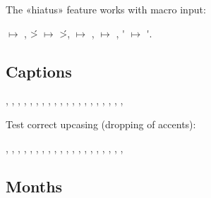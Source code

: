 \documentclass[a4paper]{article}
\begin{document}
The «hiatus» feature works with macro input:

\acctonos\textalpha\textupsilon\textlambda\textomicron\textfinalsigma{}
$\mapsto$
\MakeUppercase{\acctonos\textalpha\textupsilon\textlambda\textomicron\textfinalsigma},
\'>\textalpha\textupsilon\textlambda\textomicron\textfinalsigma{} $\mapsto$
\MakeUppercase{\'>\textalpha\textupsilon\textlambda\textomicron\textfinalsigma},
\textmu\acctonos\textalpha\textiota\textnu\textalpha{} $\mapsto$
\MakeUppercase{\textmu\acctonos\textalpha\textiota\textnu\textalpha},
\textkappa\acctonos\textepsilon\textiota\textkappa $\mapsto$
\MakeUppercase{\textkappa\acctonos\textepsilon\textiota\textkappa},
\accpsili\textalpha\textupsilon\textpi\textnu\'\textiota\textalpha{} $\mapsto$
\MakeUppercase{\accpsili\textalpha\textupsilon\textpi\textnu\'\textiota\textalpha}.

\subsection{Captions}

\prefacename,
\refname,
\abstractname,
\bibname,
\chaptername,
\appendixname,
\contentsname,
\listfigurename ,
\listtablename,
\indexname,
\figurename,
\tablename,
\partname,
\enclname,
\ccname,
\headtoname,
\pagename,
\seename,
\alsoname,
\proofname,
\glossaryname
{}

Test correct upcasing (dropping of accents):

\MakeUppercase{
\prefacename,
\refname,
\abstractname,
\bibname,
\chaptername,
\appendixname,
\contentsname,
\listfigurename,
\listtablename,
\indexname,
\figurename,
\tablename,
\partname,
\enclname,
\ccname,
\headtoname,
\pagename,
\seename,
\alsoname,
\proofname,
\glossaryname
}

\subsection{Months}
\end{document}

